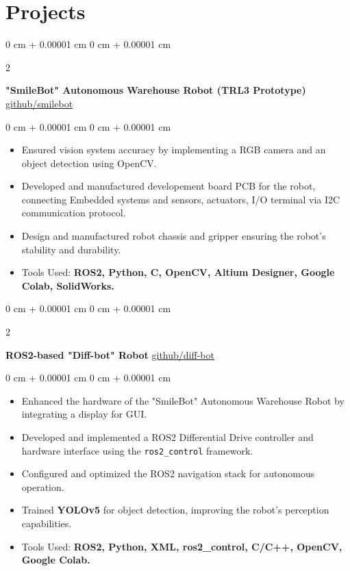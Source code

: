 \documentclass[10pt, letterpaper]{article}
\newenvironment{highlights}{
    \begin{itemize}[
        topsep=0.10 cm,
        parsep=0.10 cm,
        partopsep=0pt,
        itemsep=0pt,
        leftmargin=0 cm + 10pt
    ]
}{
    \end{itemize}
} %
\newenvironment{onecolentry}{
    \begin{adjustwidth}{
        0 cm + 0.00001 cm
    }{
        0 cm + 0.00001 cm
    }
}{
    \end{adjustwidth}
} %
\newenvironment{twocolentry}[2][]{
    \onecolentry
    \def\secondColumn{#2}
    \setcolumnwidth{\fill, 4.5 cm}
    \begin{paracol}{2}
}{
    \switchcolumn \raggedleft \secondColumn
    \end{paracol}
    \endonecolentry
} %
\begin{document}
\section{Projects}

\begin{twocolentry}{
            \href{https://github.com/bocho0600/smilebot}{github/smilebot}
      }
      \textbf{"SmileBot" Autonomous Warehouse Robot (TRL3 Prototype)}\end{twocolentry}

\vspace{0.10 cm}
\begin{onecolentry}
      \begin{highlights}
            \item Ensured vision system accuracy by implementing a RGB camera and an object
            detection using OpenCV.
            \item Developed and manufactured developement board PCB for the robot, connecting
            Embedded systems and sensors, actuators, I/O terminal via I2C communication
            protocol.
            \item Design and manufactured robot chassis and gripper ensuring the robot's
            stability and durability.
            \item Tools Used:\textbf{ ROS2, Python, C, OpenCV, Altium Designer, Google Colab,
                  SolidWorks.}
      \end{highlights}
\end{onecolentry}

\vspace{0.4 cm}

\begin{twocolentry}{
            \href{https://github.com/bocho0600/my_warehouse_diffbot}{github/diff-bot}
      }
      \textbf{ROS2-based "Diff-bot" Robot}\end{twocolentry}

\vspace{0.10 cm}
\begin{onecolentry}
      \begin{highlights}
            \item Enhanced the hardware of the "SmileBot" Autonomous Warehouse Robot by integrating a display for GUI.  
            \item Developed and implemented a ROS2 Differential Drive controller and hardware interface using the \texttt{ros2\_control} framework.  
            \item Configured and optimized the ROS2 navigation stack for autonomous operation.  
            \item Trained \textbf{YOLOv5} for object detection, improving the robot's perception capabilities.  
            \item Tools Used: \textbf{ROS2, Python, XML, ros2\_control, C/C++, OpenCV, Google Colab.}  
      \end{highlights}
\end{onecolentry}
\end{document}
